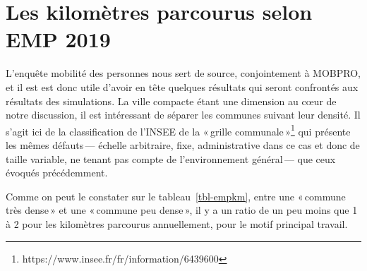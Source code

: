 \documentclass[
  9pt,
  a4paper,
  DIV=11]{scrreprt}
\begin{document}
\section{Les kilomètres parcourus selon EMP
2019}\label{les-kilomuxe8tres-parcourus-selon-emp-2019}

L'enquête mobilité des personnes nous sert de source, conjointement à
MOBPRO, et il est est donc utile d'avoir en tête quelques résultats qui
seront confrontés aux résultats des simulations. La ville compacte étant
une dimension au cœur de notre discussion, il est intéressant de séparer
les communes suivant leur densité. Il s'agit ici de la classification de
l'INSEE de la «\,grille communale\,»\footnote{https://www.insee.fr/fr/information/6439600}
qui présente les mêmes défauts\,--- échelle arbitraire, fixe,
administrative dans ce cas et donc de taille variable, ne tenant pas
compte de l'environnement général\,--- que ceux évoqués précédemment.

Comme on peut le constater sur le tableau~\ref{tbl-empkm}, entre une
«\,commune très dense\,» et une «\,commune peu dense\,», il y a un ratio
de un peu moins que 1 à 2 pour les kilomètres parcourus annuellement,
pour le motif principal travail.

\setlength{\LTpost}{0mm}
\end{document}
